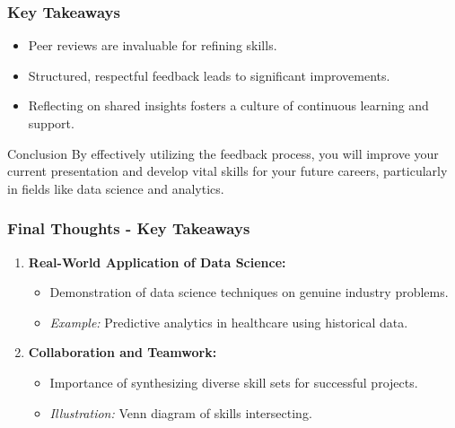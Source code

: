 \documentclass[aspectratio=169]{beamer}
\begin{document}
\begin{frame}[fragile]
    \frametitle{Key Takeaways}
    \begin{itemize}
        \item Peer reviews are invaluable for refining skills.
        \item Structured, respectful feedback leads to significant improvements.
        \item Reflecting on shared insights fosters a culture of continuous learning and support.
    \end{itemize}

    \begin{block}{Conclusion}
        By effectively utilizing the feedback process, you will improve your current presentation and develop vital skills for your future careers, particularly in fields like data science and analytics.
    \end{block}
\end{frame}

\begin{frame}[fragile]
    \frametitle{Final Thoughts - Key Takeaways}
    \begin{enumerate}
        \item \textbf{Real-World Application of Data Science:}
            \begin{itemize}
                \item Demonstration of data science techniques on genuine industry problems.
                \item \textit{Example:} Predictive analytics in healthcare using historical data.
            \end{itemize}
        \item \textbf{Collaboration and Teamwork:}
            \begin{itemize}
                \item Importance of synthesizing diverse skill sets for successful projects.
                \item \textit{Illustration:} Venn diagram of skills intersecting.
            \end{itemize}
    \end{enumerate}
\end{frame}
\end{document}
